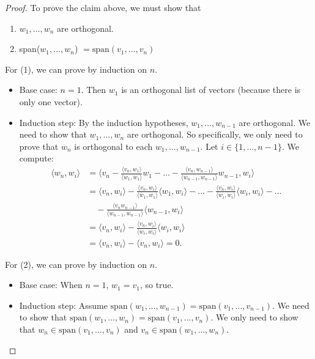 \documentclass[11pt]{article}
\begin{document}
    \begin{proof}
        To prove the claim above, we must show that
        \begin{enumerate}
            \item \(w_1,\dots, w_n\) are orthogonal.
            \item span(\(w_1, \dots, w_n\)) \( = \text{span}(v_1, \dots, v_n)\) 
        \end{enumerate}

        For (1), we can prove by induction on $n$.
        \begin{itemize}
            \item Base case: \(n=1\). Then $w_1$ is an orthogonal list of vectors (because there is only one vector).
            \item Induction step: By the induction hypotheses, \(w_1, \dots, w_{n-1}\) are orthogonal. We need to show that \(w_1, \dots, w_n\) are orthogonal. So specifically, we only need to prove that \(w_n\) is orthogonal to each \(w_1, \dots, w_{n-1}\). Let \(i \in \{1, \dots, n-1\}\). We compute: 
            \begin{align*}
                \langle w_n, w_i \rangle &= \bigg\langle v_n - \frac{\langle v_n, w_1 \rangle}{\langle w_1, w_1 \rangle} w_1 - \dots - \frac{\langle v_n, w_{n-1} \rangle}{\langle w_{n-1}, w_{n-1} \rangle} w_{n-1}, w_i \bigg\rangle \\
                &= \langle v_n, w_i \rangle - \frac{\langle v_n, w_i \rangle}{\langle w_1, w_1 \rangle} \langle w_1, w_i \rangle - \dots - \frac{\langle v_n, w_i \rangle}{\langle w_i, w_i \rangle} \langle w_i, w_i \rangle - \dots \\
                &\quad - \frac{\langle v_n w_{n-1} \rangle}{\langle w_{n-1}, w_{n-1} \rangle} \langle w_{n-1},w_i \rangle \\
                &= \langle v_n, w_i \rangle - \frac{\langle v_n, w_i \rangle}{\langle w_i, w_i \rangle} \langle w_i, w_i \rangle \\
                &= \langle v_n, w_i \rangle - \langle v_n, w_i \rangle = 0.
            \end{align*}
        \end{itemize}

        For (2), we can prove by induction on $n$.
        \begin{itemize}
            \item Base case: When \(n=1\), \(w_1 = v_1\), so true. 
            \item Induction step: Assume \(\text{span}(w_1,\dots, w_{n-1}) = \text{span}(v_1, \dots, v_{n-1})\). We need to show that \(\text{span}(w_1,\dots, w_n) = \text{span}(v_1, \dots, v_n).\) We only need to show that \(w_n \in \text{span}(v_1, \dots, v_n)\) and \(v_n \in \text{span}(w_1, \dots, w_n)\).
            

\end{itemize}
\end{proof}
\end{document}
